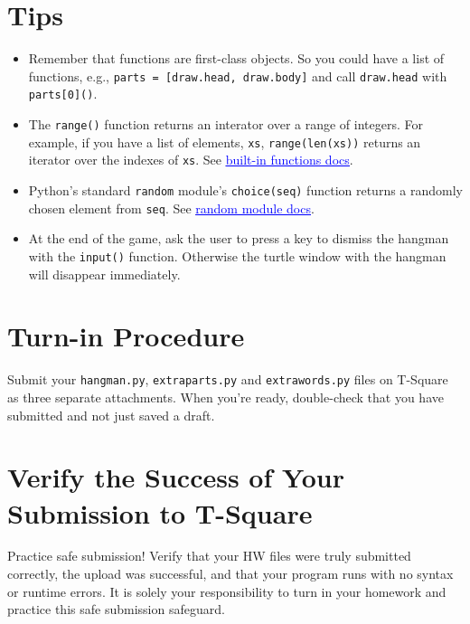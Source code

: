 \documentclass[12pt]{article}
\newcommand{\link}[2]{\href{#1}{\textcolor{blue}{\underline{#2}}}}
\begin{document}
\section{Tips}

\begin{itemize}
\itemsep0em
\item Remember that functions are first-class objects.  So you could have a list of functions, e.g., {\tt parts = [draw.head, draw.body]} and call {\tt draw.head} with {\tt parts[0]()}.
\item The {\tt range()} function returns an interator over a range of integers.  For example, if you have a list of elements, {\tt xs}, {\tt range(len(xs))} returns an iterator over the indexes of {\tt xs}. See \link{https://docs.python.org/3/library/functions.html}{built-in functions docs}.
\item Python's standard {\tt random} module's {\tt choice(seq)} function returns a randomly chosen element from {\tt seq}.  See \link{https://docs.python.org/3/library/random.html}{random module docs}.
\item At the end of the game, ask the user to press a key to dismiss the hangman with the {\tt input()} function.  Otherwise the turtle window with the hangman will disappear immediately.
\end{itemize}

\section{Turn-in Procedure}

Submit your {\tt hangman.py}, {\tt extraparts.py} and {\tt extrawords.py} files on T-Square as three separate attachments.  When you're ready, double-check that you have submitted and not just saved a draft.

\section{Verify the Success of Your Submission to T-Square}

Practice safe submission! Verify that your HW files were truly submitted correctly, the upload was successful, and that your program runs with no syntax or runtime errors. It is solely your responsibility to turn in your homework and practice this safe submission safeguard.
\end{document}
